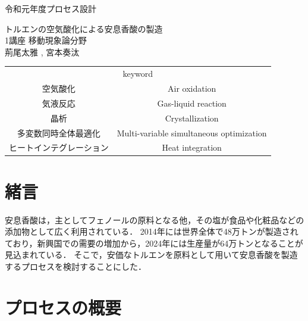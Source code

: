 \documentclass[a4j]{jsreport}
\begin{document}
\begin{titlepage}
\begin{flushleft}
{\Large 令和元年度プロセス設計} \\
\end{flushleft}
\vspace{5cm}
\centering
{\Huge トルエンの空気酸化による安息香酸の製造} \\
\vspace{2cm}
\centering
{\Large 1講座 移動現象論分野} \\
\vspace{0.5cm}
\centering
{\large 荊尾太雅 , 宮本奏汰} \\
\vspace{3cm}
\begin{table}[htbp]
    \begin{center}
        \begin{tabular}[htbp]{cc}
            \multicolumn{2}{c}{{\LARGE keyword}} \\
            {\Large 空気酸化}&{\Large Air oxidation} \\
            {\Large 気液反応}&{\Large Gas-liquid reaction} \\
            {\Large 晶析}&{\Large Crystallization} \\
            {\Large 多変数同時全体最適化}&{\Large Multi-variable simultaneous optimization} \\
            {\Large ヒートインテグレーション}&{\Large Heat integration} \\
        \end{tabular}
    \end{center}
\end{table}
\end{titlepage}


\setcounter{tocdepth}{2}
\tableofcontents

\clearpage
{}

\chapter{緒言}
安息香酸は，主としてフェノールの原料となる他，その塩が食品や化粧品などの添加物として広く利用されている．
2014年には世界全体で48万トンが製造されており，新興国での需要の増加から，2024年には生産量が64万トンとなることが見込まれている\cite{}．
そこで，安価なトルエンを原料として用いて安息香酸を製造するプロセスを検討することにした．


\clearpage
\chapter{プロセスの概要}
\end{document}
